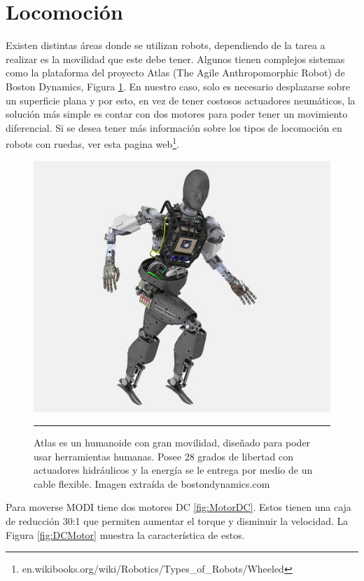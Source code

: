 \section{Locomoción}
Existen distintas áreas donde se utilizan robots, dependiendo de la tarea a realizar es la movilidad que este debe tener. Algunos tienen complejos sistemas como la plataforma del proyecto Atlas (The Agile Anthropomorphic Robot) de Boston Dynamics, Figura \ref{fig:Atlas}. En nuestro caso, solo es necesario desplazarse sobre un superficie plana y por esto, en vez de tener costosos actuadores neumáticos, la solución más simple es contar con dos motores para poder tener un movimiento diferencial. Si se desea tener más información sobre los tipos de locomoción en robots con ruedas, ver esta pagina web\footnote{en.wikibooks.org/wiki/Robotics/Types\_of\_Robots/Wheeled}.


\begin{figure}[htbp]
	\centering
		\includegraphics[width=\textwidth]{./Figures/AtlasCADlr.jpg}
		\rule{35em}{0.5pt}
	\caption[Atlas]{Atlas es un humanoide con gran movilidad, diseñado para poder usar herramientas humanas. Posee 28 grados de libertad con actuadores hidráulicos y la energía se le entrega por medio de un cable flexible. Imagen extraída de bostondynamics.com }
	\label{fig:Atlas}
\end{figure}


Para moverse MODI tiene dos motores DC \ref{fig:MotorDC}. Estos tienen una caja de reducción 30:1 que permiten aumentar el torque y disminuir la velocidad. La Figura \ref{fig:DCMotor} muestra la característica de estos. 

